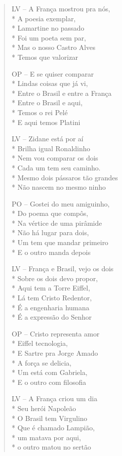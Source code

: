 \begin{verse}
LV -- A França mostrou pra nós,\\*
A poesia exemplar,\\*
Lamartine no passado\\*
Foi um poeta sem par,\\*
Mas o nosso Castro Alves\\*
Temos que valorizar

OP -- E se quiser comparar\\*
Lindas coisas que já vi,\\*
Entre o Brasil e entre a França\\*
Entre o Brasil e aqui,\\*
Temos o rei Pelé\\*
E aqui temos Platini

LV -- Zidane está por aí\\*
Brilha igual Ronaldinho\\*
Nem vou comparar os dois\\*
Cada um tem seu caminho.\\*
Mesmo dois pássaros tão grandes\\*
Não nascem no mesmo ninho

PO -- Gostei do meu amiguinho,\\*
Do poema que compôs,\\*
Na vértice de uma pirâmide\\*
Não há lugar para dois,\\*
Um tem que mandar primeiro\\*
E o outro manda depois

LV -- França e Brasil, vejo os dois\\*
Sobre os dois devo propor,\\*
Aqui tem a Torre Eiffel,\\*
Lá tem Cristo Redentor,\\*
É a engenharia humana\\*
É a expressão do Senhor

OP -- Cristo representa amor\\*
Eiffel tecnologia,\\*
E Sartre pra Jorge Amado\\*
A força se delicia,\\*
Um está com Gabriela,\\*
E o outro com filosofia

LV -- A França criou um dia\\*
Seu herói Napoleão\\*
O Brasil tem Virgulino\\*
Que é chamado Lampião,\\*
um matava por aqui,\\*
o outro matou no sertão


\end{verse}

